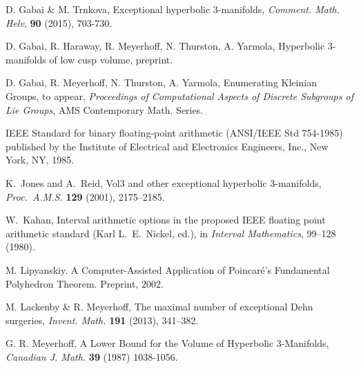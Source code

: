 \begin{thebibliography}{GHMTY}
 D. Gabai \& M. Trnkova, Exceptional hyperbolic 3-manifolds, \textit {Comment. Math. Helv}, \textbf {90} (2015), 703-730.



 D. Gabai, R. Haraway, R. Meyerhoff, N. Thurston, A. Yarmola, Hyperbolic 3-manifolds of low cusp volume, preprint.

 D. Gabai,  R. Meyerhoff, N. Thurston, A. Yarmola, Enumerating Kleinian Groups, to appear, \textit {Proceedings of  Computational Aspects of Discrete Subgroups of Lie Groups}, AMS Contemporary Math. Series.

 IEEE Standard for binary floating-point arithmetic
(ANSI/IEEE Std 754-1985) published by the Institute of 
Electrical and Electronics Engineers, Inc., New York, NY, 1985.
 
 
% 
  K.\ Jones and A.\ Reid, Vol3 and other exceptional 
hyperbolic $3$-manifolds,  \textit {Proc.\ A.M.S.} \textbf {129}
(2001), 2175--2185.
 
   W.\ Kahan, Interval arithmetic options in the 
proposed IEEE floating point arithmetic standard (Karl L.\ E.\ Nickel,
ed.), in  
\textit {Interval Mathematics\/}, 99--128 (1980). 
 


 M. Lipyanskiy. A Computer-Assisted Application
of Poincar\'e's Fundamental Polyhedron Theorem.
Preprint, 2002.

 M. Lackenby \& R. Meyerhoff, The maximal number of exceptional Dehn surgeries, \textit {Invent. Math.} \textbf {191} (2013), 341--382.


G. R. Meyerhoff, A Lower Bound for the Volume of Hyperbolic 
3-Manifolds, \textit {Canadian J. Math.} \textbf {39} (1987) 1038-1056.



\end{thebibliography}
